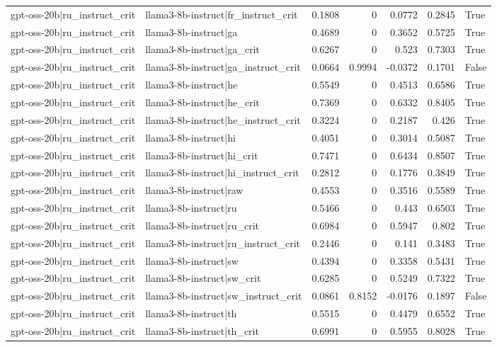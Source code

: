 \begin{table}
\begin{tabular}{l l r r r r l}
gpt-oss-20b|ru_instruct_crit & llama3-8b-instruct|fr_instruct_crit & 0.1808 & 0 & 0.0772 & 0.2845 & True \\
gpt-oss-20b|ru_instruct_crit & llama3-8b-instruct|ga & 0.4689 & 0 & 0.3652 & 0.5725 & True \\
gpt-oss-20b|ru_instruct_crit & llama3-8b-instruct|ga_crit & 0.6267 & 0 & 0.523 & 0.7303 & True \\
gpt-oss-20b|ru_instruct_crit & llama3-8b-instruct|ga_instruct_crit & 0.0664 & 0.9994 & -0.0372 & 0.1701 & False \\
gpt-oss-20b|ru_instruct_crit & llama3-8b-instruct|he & 0.5549 & 0 & 0.4513 & 0.6586 & True \\
gpt-oss-20b|ru_instruct_crit & llama3-8b-instruct|he_crit & 0.7369 & 0 & 0.6332 & 0.8405 & True \\
gpt-oss-20b|ru_instruct_crit & llama3-8b-instruct|he_instruct_crit & 0.3224 & 0 & 0.2187 & 0.426 & True \\
gpt-oss-20b|ru_instruct_crit & llama3-8b-instruct|hi & 0.4051 & 0 & 0.3014 & 0.5087 & True \\
gpt-oss-20b|ru_instruct_crit & llama3-8b-instruct|hi_crit & 0.7471 & 0 & 0.6434 & 0.8507 & True \\
gpt-oss-20b|ru_instruct_crit & llama3-8b-instruct|hi_instruct_crit & 0.2812 & 0 & 0.1776 & 0.3849 & True \\
gpt-oss-20b|ru_instruct_crit & llama3-8b-instruct|raw & 0.4553 & 0 & 0.3516 & 0.5589 & True \\
gpt-oss-20b|ru_instruct_crit & llama3-8b-instruct|ru & 0.5466 & 0 & 0.443 & 0.6503 & True \\
gpt-oss-20b|ru_instruct_crit & llama3-8b-instruct|ru_crit & 0.6984 & 0 & 0.5947 & 0.802 & True \\
gpt-oss-20b|ru_instruct_crit & llama3-8b-instruct|ru_instruct_crit & 0.2446 & 0 & 0.141 & 0.3483 & True \\
gpt-oss-20b|ru_instruct_crit & llama3-8b-instruct|sw & 0.4394 & 0 & 0.3358 & 0.5431 & True \\
gpt-oss-20b|ru_instruct_crit & llama3-8b-instruct|sw_crit & 0.6285 & 0 & 0.5249 & 0.7322 & True \\
gpt-oss-20b|ru_instruct_crit & llama3-8b-instruct|sw_instruct_crit & 0.0861 & 0.8152 & -0.0176 & 0.1897 & False \\
gpt-oss-20b|ru_instruct_crit & llama3-8b-instruct|th & 0.5515 & 0 & 0.4479 & 0.6552 & True \\
gpt-oss-20b|ru_instruct_crit & llama3-8b-instruct|th_crit & 0.6991 & 0 & 0.5955 & 0.8028 & True \\

\end{tabular}
\end{table}
